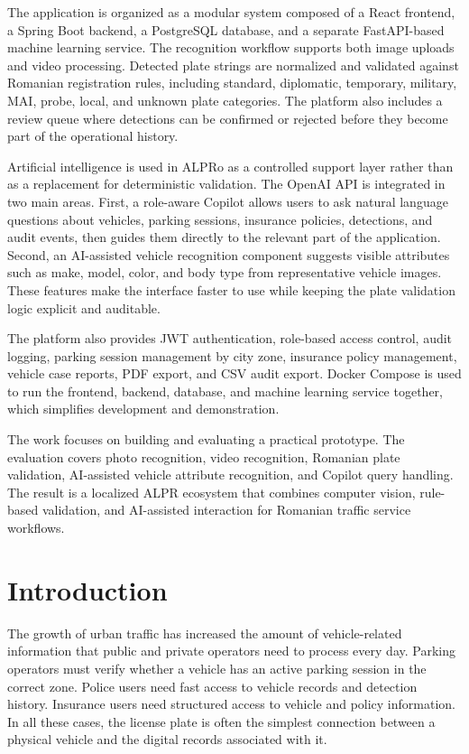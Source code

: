 ﻿\documentclass[12pt,a4paper]{article}
\begin{document}
The application is organized as a modular system composed of a React frontend, a Spring Boot backend, a PostgreSQL database, and a separate FastAPI-based machine learning service. The recognition workflow supports both image uploads and video processing. Detected plate strings are normalized and validated against Romanian registration rules, including standard, diplomatic, temporary, military, MAI, probe, local, and unknown plate categories. The platform also includes a review queue where detections can be confirmed or rejected before they become part of the operational history.

Artificial intelligence is used in ALPRo as a controlled support layer rather than as a replacement for deterministic validation. The OpenAI API is integrated in two main areas. First, a role-aware Copilot allows users to ask natural language questions about vehicles, parking sessions, insurance policies, detections, and audit events, then guides them directly to the relevant part of the application. Second, an AI-assisted vehicle recognition component suggests visible attributes such as make, model, color, and body type from representative vehicle images. These features make the interface faster to use while keeping the plate validation logic explicit and auditable.

The platform also provides JWT authentication, role-based access control, audit logging, parking session management by city zone, insurance policy management, vehicle case reports, PDF export, and CSV audit export. Docker Compose is used to run the frontend, backend, database, and machine learning service together, which simplifies development and demonstration.

The work focuses on building and evaluating a practical prototype. The evaluation covers photo recognition, video recognition, Romanian plate validation, AI-assisted vehicle attribute recognition, and Copilot query handling. The result is a localized ALPR ecosystem that combines computer vision, rule-based validation, and AI-assisted interaction for Romanian traffic service workflows.
\newpage
\tableofcontents
\newpage

\section{Introduction}

The growth of urban traffic has increased the amount of vehicle-related information that public and private operators need to process every day. Parking operators must verify whether a vehicle has an active parking session in the correct zone. Police users need fast access to vehicle records and detection history. Insurance users need structured access to vehicle and policy information. In all these cases, the license plate is often the simplest connection between a physical vehicle and the digital records associated with it.
\end{document}
